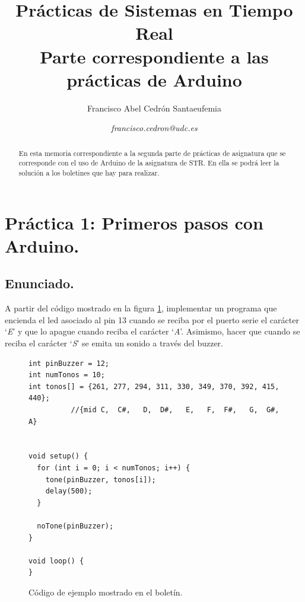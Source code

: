\documentclass{article}
\title{\textbf{Prácticas de Sistemas en Tiempo Real} \\ Parte correspondiente a las prácticas de Arduino}
\author{Francisco Abel Cedrón Santaeufemia \and \textit{francisco.cedron@udc.es}}
\date{} %
\begin{document}
\maketitle %

\renewcommand{\abstractname}{Abstract} %
\begin{abstract}
En esta memoria correspondiente a la segunda parte de prácticas de asignatura que se corresponde con el uso de Arduino de la asignatura de STR. En ella se podrá leer la solución a los boletines que hay para realizar.
\end{abstract}

\renewcommand{\contentsname}{} %
\tableofcontents

\vspace{2cm} %

\section{Práctica 1: Primeros pasos con Arduino.}

\subsection{Enunciado.}

A partir del código mostrado en la figura \ref{cod:p1:ejemplo_buzzer}, implementar un programa que encienda el led asociado al pin 13 cuando se reciba por el puerto serie el carácter `\textit{E}' y que lo apague cuando reciba el carácter `\textit{A}'. Asimismo, hacer que cuando se reciba el carácter `\textit{S}' se emita un sonido a través del buzzer.

\begin{figure}[h]
	\begin{lstlisting}[style=C]
int pinBuzzer = 12;
int numTonos = 10;
int tonos[] = {261, 277, 294, 311, 330, 349, 370, 392, 415, 440};
          //{mid C,  C#,   D,  D#,   E,   F,  F#,   G,  G#, A}


void setup() {
  for (int i = 0; i < numTonos; i++) {
    tone(pinBuzzer, tonos[i]);
    delay(500);
  }
  
  noTone(pinBuzzer);
}

void loop() {
}
	\end{lstlisting}
	\caption{Código de ejemplo mostrado en el boletín.}
	\label{cod:p1:ejemplo_buzzer}
\end{figure}
\end{document}
